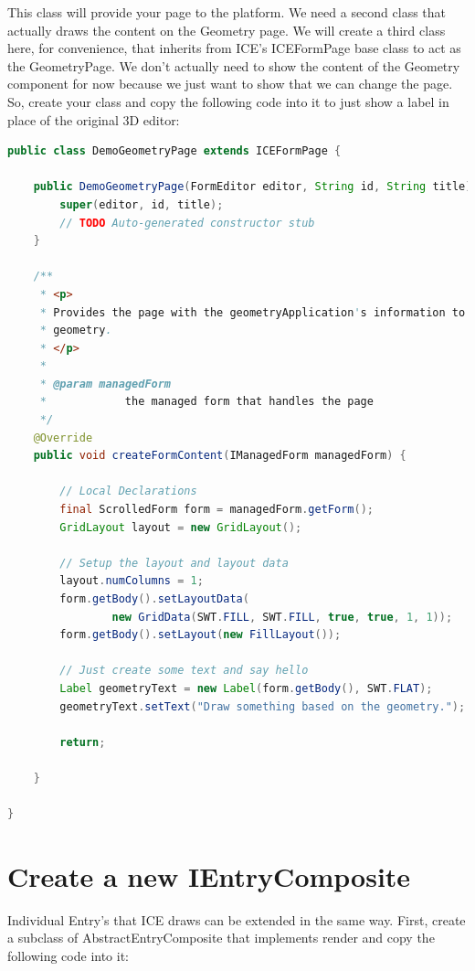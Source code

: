 This class will provide your page to the platform. We need a second class that
actually draws the content on the Geometry page. We will create a third class
here, for convenience, that inherits from ICE’s ICEFormPage base class to act
as the GeometryPage. We don’t actually need to show the content of the Geometry
component for now because we just want to show that we can change the page. So,
create your class and copy the following code into it to just show a label in
place of the original 3D editor:

\begin{lstlisting}[language=java]
public class DemoGeometryPage extends ICEFormPage {

    public DemoGeometryPage(FormEditor editor, String id, String title) {
        super(editor, id, title);
        // TODO Auto-generated constructor stub
    }

    /**
     * <p>
     * Provides the page with the geometryApplication's information to display
     * geometry.
     * </p>
     *
     * @param managedForm
     *            the managed form that handles the page
     */
    @Override
    public void createFormContent(IManagedForm managedForm) {

        // Local Declarations
        final ScrolledForm form = managedForm.getForm();
        GridLayout layout = new GridLayout();

        // Setup the layout and layout data
        layout.numColumns = 1;
        form.getBody().setLayoutData(
                new GridData(SWT.FILL, SWT.FILL, true, true, 1, 1));
        form.getBody().setLayout(new FillLayout());

        // Just create some text and say hello
        Label geometryText = new Label(form.getBody(), SWT.FLAT);
        geometryText.setText("Draw something based on the geometry.");

        return;

    }

}
\end{lstlisting}

\section{Create a new IEntryComposite}

Individual Entry’s that ICE draws can be extended in the same way. First,
create a subclass of AbstractEntryComposite that implements render and copy the
following code into it:

